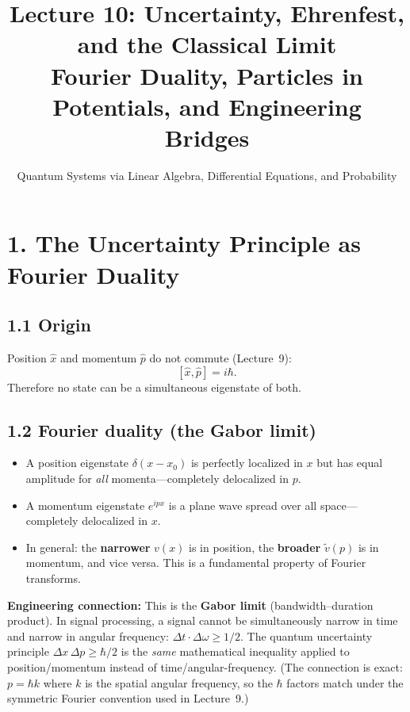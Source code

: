 \documentclass[12pt,a4paper]{article}
\title{\textbf{Lecture 10: Uncertainty, Ehrenfest, and the Classical Limit} \\ \large Fourier Duality, Particles in Potentials, and Engineering Bridges}
\author{Quantum Systems via Linear Algebra, Differential Equations, and Probability}
\date{}
\begin{document}
\maketitle
\thispagestyle{fancy}

\section{1. The Uncertainty Principle as Fourier Duality}

\subsection{1.1 Origin}
Position $\hat{x}$ and momentum $\hat{p}$ do not commute (Lecture~9):
\[
    [\hat{x},\hat{p}] = i\hbar.
\]
Therefore no state can be a simultaneous eigenstate of both.

\subsection{1.2 Fourier duality (the Gabor limit)}
\begin{itemize}[nosep]
    \item A position eigenstate $\delta(x-x_0)$ is perfectly localized in $x$ but has equal amplitude for \emph{all} momenta---completely delocalized in $p$.
    \item A momentum eigenstate $e^{ipx}$ is a plane wave spread over all space---completely delocalized in $x$.
    \item In general: the \textbf{narrower} $v(x)$ is in position, the \textbf{broader} $\tilde{v}(p)$ is in momentum, and vice versa.  This is a fundamental property of Fourier transforms.
\end{itemize}

\medskip
\noindent\textbf{Engineering connection:} This is the \textbf{Gabor limit} (bandwidth--duration product).  In signal processing, a signal cannot be simultaneously narrow in time and narrow in angular frequency: $\Delta t \cdot \Delta\omega \geq 1/2$.  The quantum uncertainty principle $\Delta x\,\Delta p \geq \hbar/2$ is the \emph{same} mathematical inequality applied to position/momentum instead of time/angular-frequency.  (The connection is exact: $p = \hbar k$ where $k$ is the spatial angular frequency, so the $\hbar$ factors match under the symmetric Fourier convention used in Lecture~9.)
\end{document}
